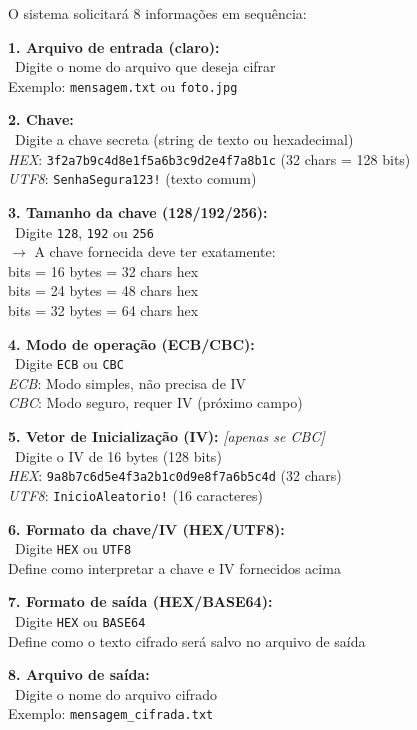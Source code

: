 \documentclass[12pt,a4paper]{article}
\begin{document}
O sistema solicitará 8 informações em sequência:

\begin{tcolorbox}[colback=primaryblue!10,colframe=primaryblue,title={\faLock\ Campos para Cifragem AES}]

\textbf{1. Arquivo de entrada (claro):}\\
\quad \faFileAlt\ Digite o nome do arquivo que deseja cifrar\\
\quad Exemplo: \texttt{mensagem.txt} ou \texttt{foto.jpg}

\textbf{2. Chave:}\\
\quad \faKey\ Digite a chave secreta (string de texto ou hexadecimal)\\
\quad \textit{HEX}: \texttt{3f2a7b9c4d8e1f5a6b3c9d2e4f7a8b1c} (32 chars = 128 bits)\\
\quad \textit{UTF8}: \texttt{SenhaSegura123!} (texto comum)

\textbf{3. Tamanho da chave (128/192/256):}\\
\quad \faHashtag\ Digite \texttt{128}, \texttt{192} ou \texttt{256}\\
\quad $\rightarrow$ A chave fornecida deve ter exatamente:\\
\quad {} bits = 16 bytes = 32 chars hex\\
\quad {} bits = 24 bytes = 48 chars hex\\
\quad {} bits = 32 bytes = 64 chars hex

\textbf{4. Modo de operação (ECB/CBC):}\\
\quad \faCogs\ Digite \texttt{ECB} ou \texttt{CBC}\\
\quad \textit{ECB}: Modo simples, não precisa de IV\\
\quad \textit{CBC}: Modo seguro, requer IV (próximo campo)

\textbf{5. Vetor de Inicialização (IV):} \textit{[apenas se CBC]}\\
\quad \faRandom\ Digite o IV de 16 bytes (128 bits)\\
\quad \textit{HEX}: \texttt{9a8b7c6d5e4f3a2b1c0d9e8f7a6b5c4d} (32 chars)\\
\quad \textit{UTF8}: \texttt{InicioAleatorio!} (16 caracteres)

\textbf{6. Formato da chave/IV (HEX/UTF8):}\\
\quad \faCode\ Digite \texttt{HEX} ou \texttt{UTF8}\\
\quad Define como interpretar a chave e IV fornecidos acima

\textbf{7. Formato de saída (HEX/BASE64):}\\
\quad \faFileCode\ Digite \texttt{HEX} ou \texttt{BASE64}\\
\quad Define como o texto cifrado será salvo no arquivo de saída

\textbf{8. Arquivo de saída:}\\
\quad \faSave\ Digite o nome do arquivo cifrado\\
\quad Exemplo: \texttt{mensagem\_cifrada.txt}

\end{tcolorbox}
\end{document}
